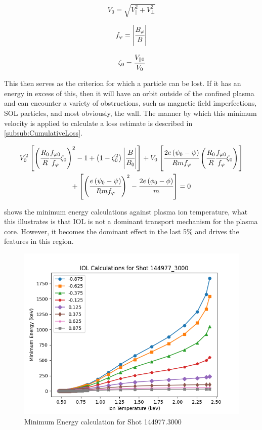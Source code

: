 \begin{equation}
	V_0 = \sqrt{V_\parallel^2 + V_\perp^2}
	\label{eqn:IOLV0}
\end{equation}

\begin{equation}
	f_\varphi = \left|\cfrac{B_\varphi}{B}\right|
	\label{eqn:IOLfphi}
\end{equation}

\begin{equation}
	\zeta_0 = \cfrac{V_{\parallel 0}}{V_0}
	\label{eqn:IOLzeta0}
\end{equation}

This then serves as the criterion for which a particle can be lost. If it has an energy in excess of this, then it will have an orbit outside of the confined plasma and can encounter a variety of obstructions, such as magnetic field imperfections, \ac{SOL} particles, and most obviously, the wall. The manner by which this minimum velocity is applied to calculate a loss estimate is described in \cref{subsub:CumulativeLoss}.

\begin{equation}
	\begin{gathered}
			V^2_0 \left[ \left( \cfrac{R_0}{R} \cfrac{f_{\varphi 0}}{f_{\varphi}} \zeta_0 \right)^2 -1 + 
		\left( 1 - \zeta^2_0 \right) \left| \cfrac{B}{B_0} \right|  \right] + 
		V_0 \left[ \cfrac{2e \left( \psi_0 - \psi \right) }{R m f_\varphi} \left( \cfrac{R_0}{R}  \cfrac{f_{\varphi 0}}{f_\varphi} \zeta_0 \right)^{\vphantom{2}}   \right] \\
		+ \left[ \left( \cfrac{e\left( \psi_0 - \psi \right) }{R m f_\varphi} \right)^2 - \cfrac{2 e \left(\phi_0 - \phi  \right) }{m} \right] = 0
	\end{gathered}
	\label{eqn:IOLMinV0}
\end{equation}

 shows the minimum energy calculations against plasma ion temperature, what this illustrates is that \ac{IOL} is not a dominant transport mechanism for the plasma core. However, it becomes the dominant effect in the last 5\% \cite{Stacey2013} and drives the features in this region.

\begin{figure}
	\centering
	\includegraphics[width=0.5\linewidth]{images/iol_calculations}
	\caption[IOL Calculation]{Minimum Energy calculation for Shot 144977.3000}
	\label{fig:iolCalc}
\end{figure}


